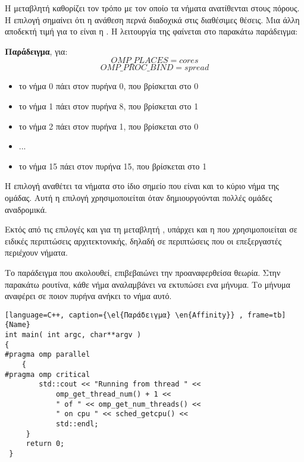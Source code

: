 Η μεταβλητή \emph{} καθορίζει τον τρόπο με τον οποίο τα νήματα ανατίθενται στους πόρους. Η επιλογή
\emph{} σημαίνει ότι η ανάθεση περνά διαδοχικά στις διαθέσιμες θέσεις. Μια άλλη αποδεκτή
τιμή για το \emph{} είναι η \emph{}. Η λειτουργία της φαίνεται στο παρακάτω παράδειγμα: 

\clearpage
\textbf{Παράδειγμα}, για:
$$OMP\_PLACES=cores$$
$$OMP\_PROC\_BIND=spread$$

\begin{itemize}
\item{το νήμα 0 πάει στον πυρήνα 0, που βρίσκεται στο \emph{} 0}
\item{το νήμα 1 πάει στον πυρήνα 8, που βρίσκεται στο \emph{} 1}
\item{το νήμα 2 πάει στον πυρήνα 1, που βρίσκεται στο \emph{} 0}
\item{...}
\item{το νήμα 15 πάει στον πυρήνα 15, που βρίσκεται στο \emph{} 1}
\end{itemize}

Η επιλογή \emph{} αναθέτει τα νήματα στο ίδιο σημείο που είναι και το κύριο νήμα της ομάδας.
Αυτή η επιλογή χρησιμοποιείται όταν δημιουργούνται πολλές ομάδες αναδρομικά.

Εκτός από τις επιλογές \emph{} και \emph{} για τη μεταβλητή \emph{}, υπάρχει και η
\emph{} που χρησιμοποιείται σε ειδικές περιπτώσεις αρχιτεκτονικής, δηλαδή σε περιπτώσεις που οι επεξεργαστές
περιέχουν νήματα\cite{affinity2}.

Το παράδειγμα που ακολουθεί, επιβεβαιώνει την προαναφερθείσα θεωρία. Στην παρακάτω ρουτίνα, κάθε νήμα αναλαμβάνει να εκτυπώσει ενα μήνυμα. Το μήνυμα αναφέρει σε ποιον πυρήνα ανήκει το νήμα αυτό\cite{klencockwood}.
\begin{spacing}{1.0}
\begin{lstlisting}[language=C++, caption={\el{Παράδειγμα} \en{Affinity}} , frame=tb]{Name}
int main( int argc, char**argv )
{
#pragma omp parallel
    {
#pragma omp critical
        std::cout << "Running from thread " <<
            omp_get_thread_num() + 1 <<
            " of " << omp_get_num_threads() <<
            " on cpu " << sched_getcpu() <<
            std::endl;
     }
     return 0;
 }

\end{lstlisting}
\end{spacing}


